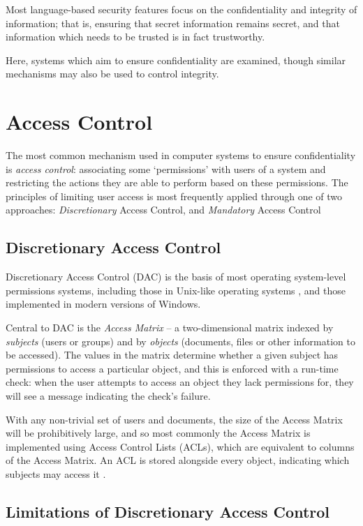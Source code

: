 Most language-based security features focus on the confidentiality and integrity of information; that is, ensuring that secret information remains secret, and that information which needs to be trusted is in fact trustworthy.

Here, systems which aim to ensure confidentiality are examined, though similar mechanisms may also be used to control integrity.

\section{Access Control}

The most common mechanism used in computer systems to ensure confidentiality is \textit{access control}: associating some `permissions' with users of a system and restricting the actions they are able to perform based on these permissions. The principles of limiting user access is most frequently applied through one of two approaches: \textit{Discretionary} Access Control, and \textit{Mandatory} Access Control

\subsection{Discretionary Access Control} \label{theory_dac_def}

Discretionary Access Control (DAC) is the basis of most operating system-level permissions systems, including those in Unix-like operating systems \cite{sandhu1996role}, and those implemented in modern versions of Windows.

Central to DAC is the \textit{Access Matrix} \cite{sandhu1994access} -- a two-dimensional matrix indexed by \textit{subjects} (users or groups) and by \textit{objects} (documents, files or other information to be accessed). The values in the matrix determine whether a given subject has permissions to access a particular object, and this is enforced with a run-time check: when the user attempts to access an object they lack permissions for, they will see a message indicating the check's failure.

With any non-trivial set of users and documents, the size of the Access Matrix will be prohibitively large, and so most commonly the Access Matrix is implemented using Access Control Lists (ACLs), which are equivalent to columns of the Access Matrix. An ACL is stored alongside every object, indicating which subjects may access it \cite{sandhu1994access}.

\subsection{Limitations of Discretionary Access Control} \label{theory_dac_limitations}

